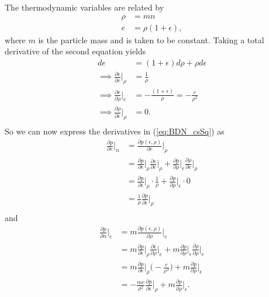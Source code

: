 \documentclass[12pt]{article}
\numberwithin{equation}{section}
\begin{document}
The thermodynamic variables are related by
\begin{align}
\rho &= m n \\
e    &= \rho (1 + \epsilon),
\end{align}
where $m$ is the particle mass and is taken to be constant.
Taking a total derivative of the second equation yields
\begin{equation}
\begin{aligned}
de &= (1 + \epsilon) d \rho + \rho d \epsilon \\
\implies \frac{\partial \epsilon}{\partial e} \Big|_\rho &= \frac{1}{\rho} \\
\implies \frac{\partial \epsilon}{\partial \rho} \Big|_e &= -\frac{(1+\epsilon)}{\rho} = - \frac{e}{\rho^2} \\
\implies \frac{\partial \rho}{\partial e} \Big|_\rho &= 0. \\
\end{aligned}
\end{equation}
So we can now express the derivatives in (\ref{eq:BDN_csSq}) as
\begin{equation} \label{eq:dpde_n}
\begin{aligned}
\frac{\partial p}{\partial e} \Big|_n &= \frac{\partial p(\epsilon, \rho)}{\partial e} \Big|_\rho \\
&= \frac{\partial p}{\partial \epsilon} \Big|_\rho \frac{\partial \epsilon}{\partial e} \Big|_\rho + \frac{\partial p}{\partial \rho} \Big|_\epsilon \frac{\partial \rho}{\partial e} \Big|_\rho \\
&= \frac{\partial p}{\partial \epsilon} \Big|_\rho \cdot \frac{1}{\rho} + \frac{\partial p}{\partial \rho} \Big|_\epsilon \cdot 0 \\
&= \frac{1}{\rho} \frac{\partial p}{\partial \epsilon} \Big|_\rho \\
\end{aligned}
\end{equation}
and
\begin{equation} \label{eq:dpdn_e}
\begin{aligned}
\frac{\partial p}{\partial n} \Big|_e &= m \frac{\partial p(\epsilon, \rho)}{\partial \rho} \Big|_e \\
&= m \frac{\partial p}{\partial \epsilon} \Big|_\rho \frac{\partial \epsilon}{\partial \rho} \Big|_e + m \frac{\partial p}{\partial \rho} \Big|_\epsilon \frac{\partial \rho}{\partial \rho} \Big|_e \\
&= m \frac{\partial p}{\partial \epsilon} \Big|_\rho \Big( -\frac{e}{\rho^2} \Big) + m \frac{\partial p}{\partial \rho} \Big|_\epsilon \\
&= -\frac{m e}{\rho^2} \frac{\partial p}{\partial \epsilon} \Big|_\rho + m \frac{\partial p}{\partial \rho} \Big|_\epsilon. \\
\end{aligned}
\end{equation}
\end{document}
